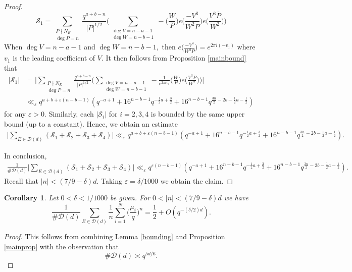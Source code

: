 \documentclass[12pt,reqno]{amsart}
\newcommand{\CS}{\mathcal{S}}
\newtheorem{cor}[lem]{Corollary}
\begin{document}
\begin{proof}
$$
\CS_1 = \sum_{\substack{P \nmid N_E \\ \deg P = n}}
\frac{q^{a+b - n }}{|P|^{1/2}} \Big ( \sum_{\substack{\deg V = n- a -1 \\ \deg W = n- b -1}} - \Big (\frac{W}{P} \Big ) e\Big ( \frac{-V^3}{W^2P} \Big ) e\Big ( \frac{V^3\overline{P}}{W^2} \Big ) \Big ) $$
When $\deg V = n-a -1$ and $\deg W = n-b-1,$ then $e\Big ( \frac{-V^3}{W^2P} \Big ) = e^{2\pi i(-v_1)}$ where $v_1$ is the leading coefficient of $V$. It then follows from Proposition \ref{mainbound} that
\begin{align*}
\big | \CS_1 \big | &= \Big | \sum_{\substack{P \nmid N_E \\ \deg P = n}} \frac{q^{a+b- n }}{|P|^{1/2}} \Big ( \sum_{\substack{\deg V = n- a -1 \\ \deg W = n- b -1}} - \frac{1}{e^{2\pi i v_1}} \Big (\frac{W}{P} \Big ) e\Big ( \frac{V^3\overline{P}}{W^2} \Big ) \Big ) \Big | \\
& \ll_{\varepsilon} q^{a+b  + \varepsilon ( n- b - 1)} ( q^{- a +1}+ 16^{n-b -1} q^{-\frac{1}{2} a+\frac{3}{2}} + 16^{n- b -1} q^{\frac{3n}{2}-2 b - \frac{1}{2} a - \frac{1}{2}} )
\end{align*}
for any $\varepsilon >0$. Similarly, each $|\CS_i|$ for $i=2,3,4$ is bounded by the same upper bound (up to a constant). Hence, we obtain an estimate
\begin{align*}
\Big | \sum\limits_{E \in \mathcal{D}(d)} (\CS_1 + \CS_2 + \CS_3 + \CS_4)  \Big | %
\ll_{\varepsilon} q^{a+b + \varepsilon ( n- b - 1 )} ( q^{- a +1}+ 16^{n- b -1} q^{-\frac{1}{2}a + \frac{3}{2}} + 16^{n-b -1} q^{\frac{3n}{2}-2 b - \frac{1}{2} a - \frac{1}{2}} ).
\end{align*}


In conclusion, 
\begin{align*}
\frac{1}{ \# \mathcal{D}(d)} \Big |\sum\limits_{E \in \mathcal{D}(d)} (\CS_1 + \CS_2 + \CS_3 + \CS_4)\Big |
\ll_{\varepsilon} q^{\varepsilon ( n- b - 1)} ( q^{- a +1}+ 16^{n-b -1} q^{-\frac{1}{2}a + \frac{3}{2}} + 16^{n- b-1} q^{\frac{3n}{2}-2 b - \frac{1}{2} a - \frac{1}{2}} ).
\end{align*}
Recall that $|n| < (7/9 - \delta) d$. Taking $\varepsilon = \delta / 1000$ we obtain the claim.
\end{proof}

\begin{cor}\label{maincor} 
Let $0 < \delta < 1 / 1000$ be given. For $0 < |n| < (7 / 9 - \delta) d$ we have
    $$ \frac{1}{\# \mathcal{D}(d)} \sum_{E \in \mathcal{D}(d)} \frac{1}{n}\sum\limits_{i=1}^{N} \Big ( \frac{\mu_i}{q} \Big )^n = \frac{1}{2}  + O(q^{- (\delta / 2) d}).$$
\end{cor}
\begin{proof}
This follows from combining Lemma \ref{bounding} and Proposition \ref{mainprop} with the observation that 
$$
\#\mathcal{D}(d) \asymp q^{5 d / 6}.
$$
\end{proof}
\end{document}

